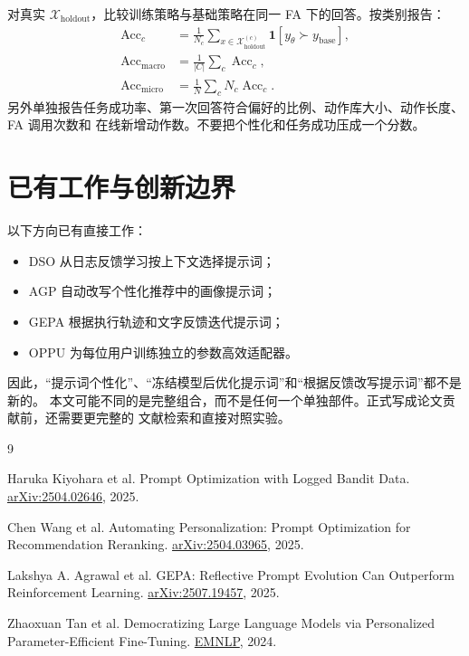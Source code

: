 \documentclass[11pt,UTF8,fontset=fandol]{ctexart}
\newcommand{\Xholdout}{\mathcal X_{\mathrm{holdout}}}
\begin{document}
对真实 \(\Xholdout\)，比较训练策略与基础策略在同一 FA 下的回答。按类别报告：
\begin{align}
  \operatorname{Acc}_c
  &=
  \frac{1}{N_c}
  \sum_{x\in\Xholdout^{(c)}}
  \mathbf 1[y_{\theta}\succ y_{\mathrm{base}}],\\
  \operatorname{Acc}_{\mathrm{macro}}
  &=
  \frac{1}{|C|}
  \sum_c\operatorname{Acc}_c,\\
  \operatorname{Acc}_{\mathrm{micro}}
  &=
  \frac{1}{N}
  \sum_c N_c\operatorname{Acc}_c.
\end{align}
另外单独报告任务成功率、第一次回答符合偏好的比例、动作库大小、动作长度、FA 调用次数和
在线新增动作数。不要把个性化和任务成功压成一个分数。

\section{已有工作与创新边界}

以下方向已有直接工作：
\begin{itemize}
  \item DSO 从日志反馈学习按上下文选择提示词；
  \item AGP 自动改写个性化推荐中的画像提示词；
  \item GEPA 根据执行轨迹和文字反馈迭代提示词；
  \item OPPU 为每位用户训练独立的参数高效适配器。
\end{itemize}
因此，``提示词个性化''、``冻结模型后优化提示词''和``根据反馈改写提示词''都不是新的。
本文可能不同的是完整组合，而不是任何一个单独部件。正式写成论文贡献前，还需要更完整的
文献检索和直接对照实验。

{\footnotesize\raggedright
\begin{thebibliography}{9}
\setlength{\itemsep}{1pt}

Haruka Kiyohara et al.
\newblock Prompt Optimization with Logged Bandit Data.
\newblock \href{https://arxiv.org/abs/2504.02646}{arXiv:2504.02646}, 2025.

Chen Wang et al.
\newblock Automating Personalization: Prompt Optimization for Recommendation
Reranking.
\newblock \href{https://arxiv.org/abs/2504.03965}{arXiv:2504.03965}, 2025.

Lakshya A. Agrawal et al.
\newblock GEPA: Reflective Prompt Evolution Can Outperform Reinforcement
Learning.
\newblock \href{https://arxiv.org/abs/2507.19457}{arXiv:2507.19457}, 2025.

Zhaoxuan Tan et al.
\newblock Democratizing Large Language Models via Personalized
Parameter-Efficient Fine-Tuning.
\newblock \href{https://aclanthology.org/2024.emnlp-main.372/}{EMNLP}, 2024.

\end{thebibliography}
}
\end{document}
